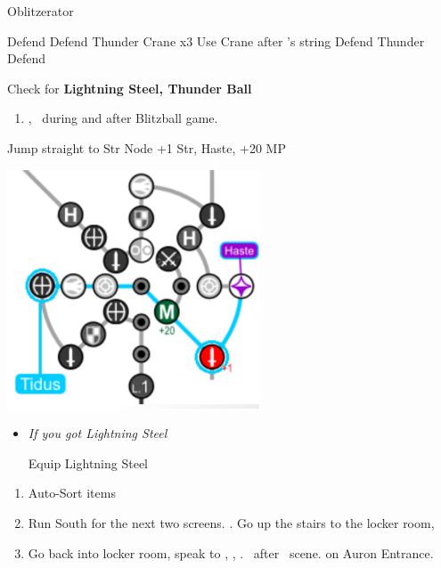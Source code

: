 \begin{battle}[3000]{Oblitzerator}
\begin{itemize}
	\kimahrif Defend
	\tidusf Defend
	\luluf Thunder Crane x3
	\tidusf Use Crane after \lulu's string
	\kimahrif Defend
	\luluf Thunder
	\tidusf Defend
\end{itemize}
Check for \textbf{Lightning Steel, Thunder Ball}
\end{battle}
\begin{enumerate}[resume]
	\item \cs[2:00], \sd\ during and after Blitzball game.
\end{enumerate}
\begin{spheregrid}
	\begin{itemize}
		\tidusf Jump straight to Str Node
		\tidusf +1 Str, Haste, +20 MP
	\end{itemize}
	\includegraphics{graphics/haste}
\end{spheregrid}
\begin{equip}
	\begin{itemize}
		\item \textit{If you got Lightning Steel}
		\begin{itemize}
			\tidusf Equip Lightning Steel
		\end{itemize}
	\end{itemize}
\end{equip}
\begin{enumerate}[resume]
	\item Auto-Sort items
	\item Run South for the next two screens. \save. Go up the stairs to the locker room, \sd
	\item Go back into locker room, speak to \wakka, \sd, \cs[1:20]. \sd\ after \lulu\ scene. \cs[1:40] on Auron Entrance.
\end{enumerate}
